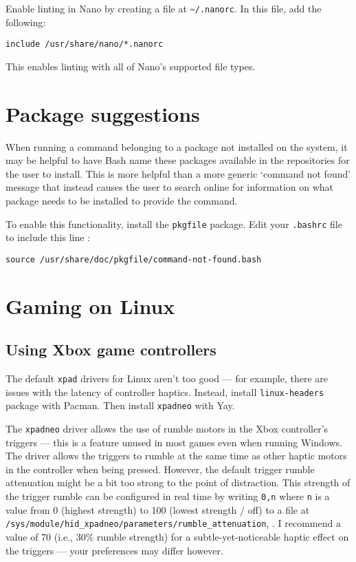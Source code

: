 \documentclass[a4paper]{article}
\begin{document}
Enable linting in Nano by creating a file at \lstinline|~/.nanorc|.
In this file, add the following:
\begin{lstlisting}
include /usr/share/nano/*.nanorc
\end{lstlisting}
This enables linting with all of Nano's supported file types.

\section{Package suggestions}

When running a command belonging to a package not installed on the system, it may be helpful to have Bash name these packages available in the repositories for the user to install.
This is more helpful than a more generic `command not found' message that instead causes the user to search online for information on what package needs to be installed to provide the command.

To enable this functionality, install the \lstinline|pkgfile| package.
Edit your \lstinline|.bashrc| file to include this line \cite{arch-command-not-found}:
\begin{lstlisting}
source /usr/share/doc/pkgfile/command-not-found.bash
\end{lstlisting}

\section{Gaming on Linux}

\subsection{Using Xbox game controllers}

The default \lstinline|xpad| drivers for Linux aren't too good --- for example, there are issues with the latency of controller haptics.
Instead, install \lstinline|linux-headers| package with Pacman.
Then install \lstinline|xpadneo| with Yay.

The \lstinline|xpadneo| driver allows the use of rumble motors in the Xbox controller's triggers --- this is a feature unused in most games even when running Windows.
The driver allows the triggers to rumble at the same time as other haptic motors in the controller when being pressed.
However, the default trigger rumble attenuation might be a bit too strong to the point of distraction.
This strength of the trigger rumble can be configured in real time by writing \lstinline|0,n|  where \lstinline|n| is a value from 0 (highest strength) to 100 (lowest strength / off) to a file at \lstinline|/sys/module/hid_xpadneo/parameters/rumble_attenuation|, \cite{xpadneo-troubleshooting}.
I recommend a value of 70 (i.e., 30\% rumble strength) for a subtle-yet-noticeable haptic effect on the triggers --- your preferences may differ however.
\end{document}
